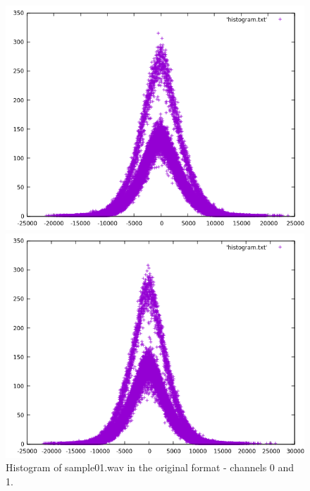\documentclass[12pt]{article}
\begin{document}
\begin{figure}[H]
  \centering
  \begin{minipage}{.5\textwidth}
    \centering
    \includegraphics[width=\linewidth]{sample01_stereo_0.png}
  \end{minipage}%
  \begin{minipage}{.5\textwidth}
    \centering
    \includegraphics[width=\linewidth]{sample01_stereo_1.png}
  \end{minipage}
  \caption{Histogram of sample01.wav in the original format - channels 0 and 1.}
  \label{fig:histogram_stereo}
  

\end{figure}
\end{document}
